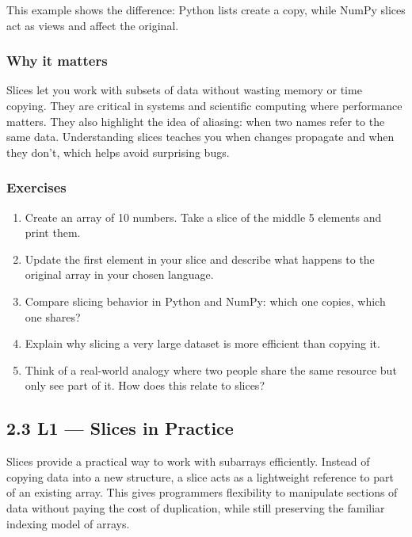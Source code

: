 \documentclass[
  letterpaper,
  DIV=11,
  numbers=noendperiod]{scrreprt}
\providecommand{\tightlist}{%
  \setlength{\itemsep}{0pt}\setlength{\parskip}{0pt}}
\begin{document}
This example shows the difference: Python lists create a copy, while
NumPy slices act as views and affect the original.

\subsubsection{Why it matters}\label{why-it-matters-18}

Slices let you work with subsets of data without wasting memory or time
copying. They are critical in systems and scientific computing where
performance matters. They also highlight the idea of aliasing: when two
names refer to the same data. Understanding slices teaches you when
changes propagate and when they don't, which helps avoid surprising
bugs.

\subsubsection{Exercises}\label{exercises-18}

\begin{enumerate}
\def\labelenumi{\arabic{enumi}.}
\tightlist
\item
  Create an array of 10 numbers. Take a slice of the middle 5 elements
  and print them.
\item
  Update the first element in your slice and describe what happens to
  the original array in your chosen language.
\item
  Compare slicing behavior in Python and NumPy: which one copies, which
  one shares?
\item
  Explain why slicing a very large dataset is more efficient than
  copying it.
\item
  Think of a real-world analogy where two people share the same resource
  but only see part of it. How does this relate to slices?
\end{enumerate}

\subsection{2.3 L1 --- Slices in Practice}\label{l1-slices-in-practice}

Slices provide a practical way to work with subarrays efficiently.
Instead of copying data into a new structure, a slice acts as a
lightweight reference to part of an existing array. This gives
programmers flexibility to manipulate sections of data without paying
the cost of duplication, while still preserving the familiar indexing
model of arrays.
\end{document}
